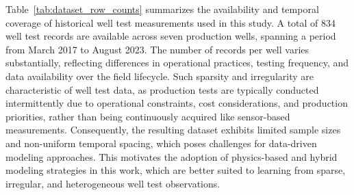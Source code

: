 \documentclass[12pt,APA]{uomthesis}
\begin{document}
\begin{table}[!htb]
\end{table}

\begin{table}[!htb]
\end{table}

Table~\ref{tab:dataset_row_counts} summarizes the availability and temporal coverage of historical well test measurements used in this study. 
A total of 834 well test records are available across seven production wells, spanning a period from March 2017 to August 2023. 
The number of records per well varies substantially, reflecting differences in operational practices, testing frequency, and data availability over the field lifecycle. 
Such sparsity and irregularity are characteristic of well test data, as production tests are typically conducted intermittently due to operational constraints, cost considerations, and production priorities, rather than being continuously acquired like sensor-based measurements. 
Consequently, the resulting dataset exhibits limited sample sizes and non-uniform temporal spacing, which poses challenges for data-driven modeling approaches. 
This motivates the adoption of physics-based and hybrid modeling strategies in this work, which are better suited to learning from sparse, irregular, and heterogeneous well test observations.
\end{document}
